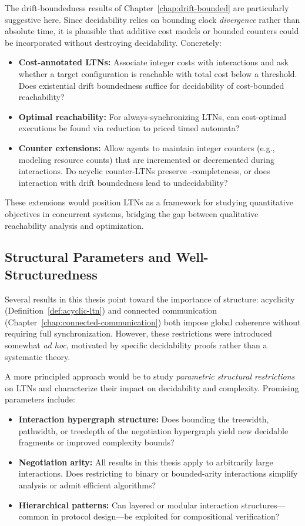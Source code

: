 The drift-boundedness results of Chapter~\ref{chap:drift-bounded} are particularly suggestive here. Since decidability relies on bounding clock \emph{divergence} rather than absolute time, it is plausible that additive cost models or bounded counters could be incorporated without destroying decidability. Concretely:
\begin{itemize}
\item \textbf{Cost-annotated LTNs:} Associate integer costs with interactions and ask whether a target configuration is reachable with total cost below a threshold. Does existential drift boundedness suffice for decidability of cost-bounded reachability?
\item \textbf{Optimal reachability:} For always-synchronizing LTNs, can cost-optimal executions be found via reduction to priced timed automata?
\item \textbf{Counter extensions:} Allow agents to maintain integer counters (e.g., modeling resource counts) that are incremented or decremented during interactions. Do acyclic counter-LTNs preserve \NP-completeness, or does interaction with drift boundedness lead to undecidability?
\end{itemize}

These extensions would position LTNs as a framework for studying quantitative objectives in concurrent systems, bridging the gap between qualitative reachability analysis and optimization.

\subsection{Structural Parameters and Well-Structuredness}

Several results in this thesis point toward the importance of structure: acyclicity (Definition~\ref{def:acyclic-ltn}) and connected communication (Chapter~\ref{chap:connected-communication}) both impose global coherence without requiring full synchronization. However, these restrictions were introduced somewhat \emph{ad hoc}, motivated by specific decidability proofs rather than a systematic theory.

A more principled approach would be to study \emph{parametric structural restrictions} on LTNs and characterize their impact on decidability and complexity. Promising parameters include:
\begin{itemize}
\item \textbf{Interaction hypergraph structure:} Does bounding the treewidth, pathwidth, or treedepth of the negotiation hypergraph yield new decidable fragments or improved complexity bounds?
\item \textbf{Negotiation arity:} All results in this thesis apply to arbitrarily large interactions. Does restricting to binary or bounded-arity interactions simplify analysis or admit efficient algorithms?
\item \textbf{Hierarchical patterns:} Can layered or modular interaction structures—common in protocol design—be exploited for compositional verification?
\end{itemize}

